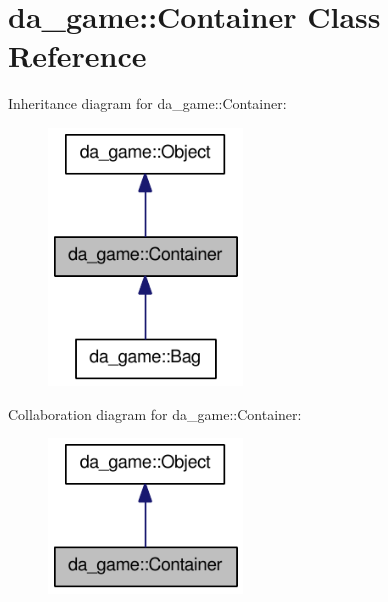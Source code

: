 \hypertarget{classda__game_1_1Container}{
\section{da\_\-game::Container Class Reference}
\label{classda__game_1_1Container}
}
Inheritance diagram for da\_\-game::Container:\nopagebreak
\begin{figure}[H]
\begin{center}
\leavevmode
\includegraphics[width=146pt]{classda__game_1_1Container__inherit__graph}
\end{center}
\end{figure}
Collaboration diagram for da\_\-game::Container:\nopagebreak
\begin{figure}[H]
\begin{center}
\leavevmode
\includegraphics[width=146pt]{classda__game_1_1Container__coll__graph}
\end{center}
\end{figure}
